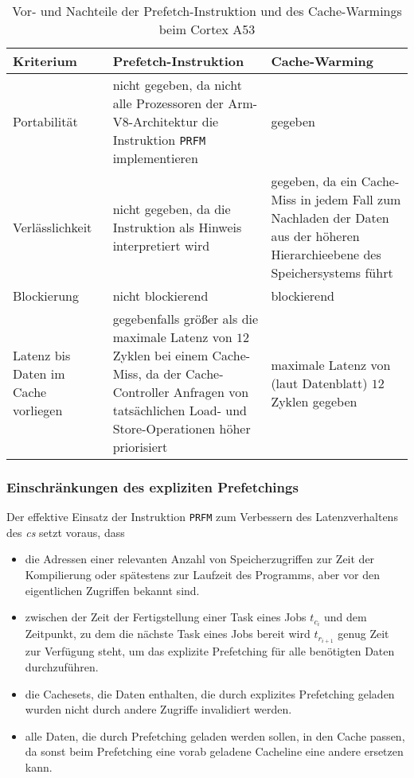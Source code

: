 \documentclass[]{scrbook}
\begin{document}
\begin{table}[h!]
\begin{tabular}{p{}|p{}|p{}}
Kriterium & Prefetch-Instruktion & Cache-Warming\\\hline

Portabilität & 
nicht gegeben, da nicht alle Prozessoren der Arm-V8-Architektur die Instruktion \texttt{PRFM} implementieren \cite{armv8a_1}
& gegeben \\\hline

Verlässlichkeit & 
nicht gegeben, da die Instruktion als Hinweis interpretiert wird \cite{armv8a_1} &
gegeben, da ein Cache-Miss in jedem Fall zum Nachladen der Daten aus der höheren Hierarchieebene des Speichersystems führt\\\hline

Blockierung &
nicht blockierend \cite{armv8a_1} & 
blockierend \\\hline

Latenz bis Daten im Cache vorliegen
& gegebenfalls größer als die maximale Latenz von $12$ Zyklen bei einem Cache-Miss, da der Cache-Controller Anfragen von tatsächlichen Load- und Store-Operationen höher priorisiert \cite{armv8a_1} &
maximale Latenz von (laut Datenblatt) $12$ Zyklen gegeben \\

\end{tabular}
\caption{Vor- und Nachteile der Prefetch-Instruktion und des Cache-Warmings beim Cortex A53}
\end{table}

\subsubsection{Einschränkungen des expliziten Prefetchings}

Der effektive Einsatz der Instruktion \texttt{PRFM} zum Verbessern des Latenzverhaltens des \textsl{\gls{c}s} setzt voraus, dass
\begin{itemize}
	\item die Adressen einer relevanten Anzahl von Speicherzugriffen zur Zeit der Kompilierung oder spätestens zur Laufzeit des Programms, aber vor den eigentlichen Zugriffen bekannt sind.
	\item zwischen der Zeit der Fertigstellung einer Task eines Jobs $t_{c_i}$ und dem Zeitpunkt, zu dem die nächste Task eines Jobs bereit wird $t_{r_{i+1}}$ genug Zeit zur Verfügung steht, um das explizite Prefetching für alle benötigten Daten durchzuführen.
	\item die Cachesets, die Daten enthalten, die durch explizites Prefetching geladen wurden nicht durch andere Zugriffe invalidiert werden.
	\item alle Daten, die durch Prefetching geladen werden sollen, in den Cache passen, da sonst beim Prefetching eine vorab geladene Cacheline eine andere ersetzen kann.
\end{itemize}
\end{document}
